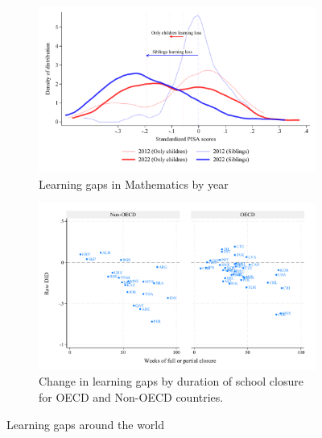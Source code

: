 


\begin{figure}[htbp]
    \centering
    
    \begin{subfigure}{\textwidth}
        \centering
        \includegraphics[width=\textwidth]{./FIGURES/Descriptive/PISA_distribution_2012_2022_PV4MATH.pdf}
        \caption{Learning gaps in Mathematics by year}
        \label{fig:1a}
    \end{subfigure}
    
    \vspace{1em} %
    
    \begin{subfigure}{\textwidth}
        \centering
        \includegraphics[width=\textwidth]{./FIGURES/Descriptive/PISA_raw_DID_PV4MATH_not_fully_open.pdf}
        \caption{Change in learning gaps by duration of school closure for OECD and Non-OECD countries.}
        \label{fig:1b}
    \end{subfigure}
    
    \caption{Learning gaps around the world}
    \label{fig:pisa}
\end{figure}


